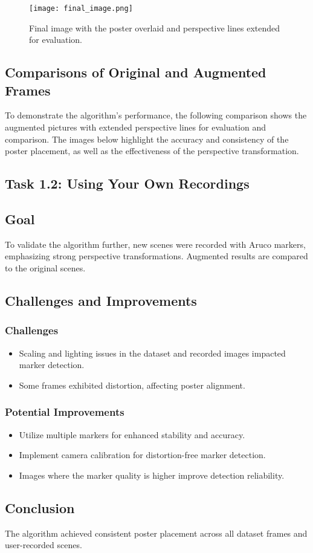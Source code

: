 \documentclass{article}
\begin{document}
\begin{figure}[H]  %
    \centering
    \texttt{[image: final\_image.png]}  %
    \caption{Final image with the poster overlaid and perspective lines extended for evaluation.}
\end{figure}

\subsection*{Comparisons of Original and Augmented Frames}
To demonstrate the algorithm’s performance, the following comparison shows the augmented pictures with extended perspective lines for evaluation and comparison. The images below highlight the accuracy and consistency of the poster placement, as well as the effectiveness of the perspective transformation.

\subsection*{Task 1.2: Using Your Own Recordings}

\subsection*{Goal}
To validate the algorithm further, new scenes were recorded with Aruco markers, emphasizing strong perspective transformations. Augmented results are compared to the original scenes.

\subsection*{Challenges and Improvements}

\subsubsection*{Challenges}
\begin{itemize}
    \item Scaling and lighting issues in the dataset and recorded images impacted marker detection.
    \item Some frames exhibited distortion, affecting poster alignment.
\end{itemize}

\subsubsection*{Potential Improvements}
\begin{itemize}
    \item Utilize multiple markers for enhanced stability and accuracy.
    \item Implement camera calibration for distortion-free marker detection.
    \item Images where the marker quality is higher improve detection reliability.
\end{itemize}

\subsection*{Conclusion}
The algorithm achieved consistent poster placement across all dataset frames and user-recorded scenes.
\end{document}
